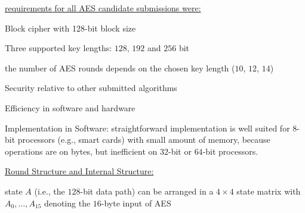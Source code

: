 \documentclass[landscape, a4paper]{article}
\begin{document}
\begin{minipage}[t]{0.2\linewidth}
\begin{betterlist}
\begin{betterlist}
		\end{betterlist}
	\end{betterlist}
	\begin{betterlist}
		\item \underline{requirements for all AES candidate submissions were:}
		\begin{betterlist}
			\item Block cipher with 128-bit block size
			\item Three supported key lengths: $128$, $192$ and $256$ bit
			\begin{betterlist}
				\item the number of AES rounds depends on the chosen key length ($10$, $12$, $14$)
			\end{betterlist}
			\item Security relative to other submitted algorithms
			\item Efficiency in software and hardware
			\begin{betterlist}
				\item \alert{Implementation in Software:} straightforward implementation is well suited for $8$-bit processors (e.g., smart cards) with small amount of memory, because operations are on bytes, but inefficient on $32$-bit or $64$-bit processors.
			\end{betterlist}
		\end{betterlist}
		\item \underline{Round Structure and Internal Structure:}
		\begin{betterlist}
			\item state $A$ (i.e., the $128$-bit data path) can be arranged in a $4\times 4$ \alert{state matrix} with $A_0,\ldots, A_{15}$ denoting the $16$-byte input of AES

\end{betterlist}
\end{betterlist}
\end{minipage}
\end{document}
